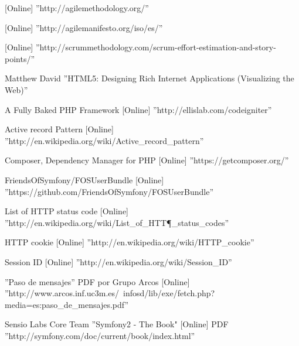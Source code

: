 \begin{thebibliography}{100}
 [Online] ''http://agilemethodology.org/''

 [Online] ''http://agilemanifesto.org/iso/es/''

 [Online] ''http://scrummethodology.com/scrum-effort-estimation-and-story-points/''

 Matthew David ''HTML5: Designing Rich Internet Applications (Visualizing the Web)''

 A Fully Baked PHP Framework [Online] ''http://ellislab.com/codeigniter''

 Active record Pattern [Online] ''http://en.wikipedia.org/wiki/Active_record_pattern''

 Composer, Dependency Manager for PHP [Online] ''https://getcomposer.org/''

 FriendsOfSymfony/FOSUserBundle [Online] ''https://github.com/FriendsOfSymfony/FOSUserBundle''

 List of HTTP status code [Online] ''http://en.wikipedia.org/wiki/List\_of\_HTT\P_status\_codes''

 HTTP cookie [Online] ''http://en.wikipedia.org/wiki/HTTP_cookie''

 Session ID [Online] ''http://en.wikipedia.org/wiki/Session_ID''

 ''Paso de mensajes'' PDF por Grupo Arcos [Online] ''http://www.arcos.inf.uc3m.es/~infosd/lib/exe/fetch.php?media=es:paso_de_mensajes.pdf''

 Sensio Labs Core Team ''Symfony2 - The Book" [Online] PDF ''http://symfony.com/doc/current/book/index.html''
\end{thebibliography}
